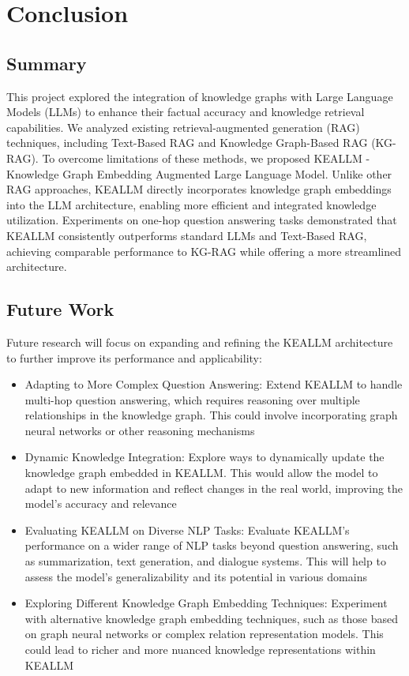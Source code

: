 \chapter{Conclusion}
\section{Summary}
This project explored the integration of knowledge graphs with Large Language Models (LLMs) to enhance their factual accuracy and knowledge retrieval capabilities. We analyzed existing retrieval-augmented generation (RAG) techniques, including Text-Based RAG and Knowledge Graph-Based RAG (KG-RAG). To overcome limitations of these methods, we proposed KEALLM - Knowledge Graph Embedding Augmented Large Language Model. Unlike other RAG approaches, KEALLM directly incorporates knowledge graph embeddings into the LLM architecture, enabling more efficient and integrated knowledge utilization. Experiments on one-hop question answering tasks demonstrated that KEALLM consistently outperforms standard LLMs and Text-Based RAG, achieving comparable performance to KG-RAG while offering a more streamlined architecture.
\section{Future Work}
Future research will focus on expanding and refining the KEALLM architecture to further improve its performance and applicability:
\begin{itemize}
\item Adapting to More Complex Question Answering: Extend KEALLM to handle multi-hop question answering, which requires reasoning over multiple relationships in the knowledge graph. This could involve incorporating graph neural networks or other reasoning mechanisms
\item Dynamic Knowledge Integration: Explore ways to dynamically update the knowledge graph embedded in KEALLM. This would allow the model to adapt to new information and reflect changes in the real world, improving the model's accuracy and relevance
\item Evaluating KEALLM on Diverse NLP Tasks: Evaluate KEALLM's performance on a wider range of NLP tasks beyond question answering, such as summarization, text generation, and dialogue systems. This will help to assess the model's generalizability and its potential in various domains
\item Exploring Different Knowledge Graph Embedding Techniques: Experiment with alternative knowledge graph embedding techniques, such as those based on graph neural networks or complex relation representation models. This could lead to richer and more nuanced knowledge representations within KEALLM
\end{itemize}


